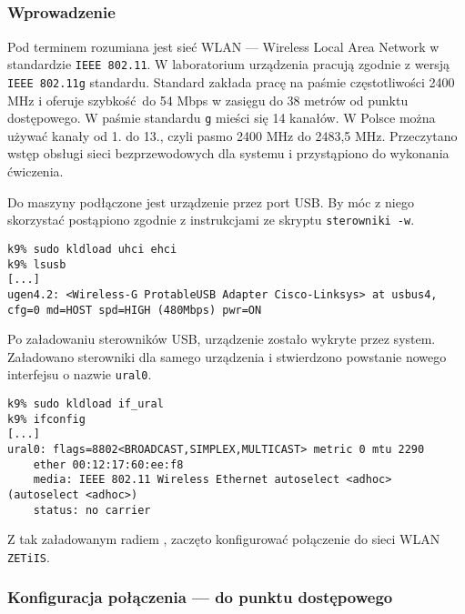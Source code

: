 \subsection{\wifi}

\subsubsection{Wprowadzenie}

Pod terminem \wifi{} rozumiana jest sieć WLAN --- Wireless Local Area Network w
standardzie \texttt{IEEE 802.11}. W laboratorium urządzenia pracują zgodnie z
wersją \texttt{IEEE 802.11g} standardu. Standard zakłada pracę na paśmie
częstotliwości 2400 MHz \cite{wifi:pasmo} i oferuje szybkość do 54 Mbps
\cite{wifi:szybkosc} w zasięgu do 38 metrów od punktu dostępowego. W paśmie
standardu \texttt{g} mieści się 14 kanałów. W Polsce można używać kanały od 1.
do 13., czyli pasmo 2400 MHz do 2483,5 MHz. Przeczytano wstęp obsługi sieci
bezprzewodowych \cite{wifi:bsd-handbook} dla systemu \bsd{} i przystąpiono do
wykonania ćwiczenia.

Do maszyny \kdziew{} podłączone jest urządzenie \wifi{} przez port USB. By móc z
niego skorzystać postąpiono zgodnie z instrukcjami ze skryptu \texttt{sterowniki
-w}.

\begin{lstlisting}
k9% sudo kldload uhci ehci
k9% lsusb
[...]
ugen4.2: <Wireless-G ProtableUSB Adapter Cisco-Linksys> at usbus4, cfg=0 md=HOST spd=HIGH (480Mbps) pwr=ON
\end{lstlisting}

Po załadowaniu sterowników USB, urządzenie \wifi{} zostało wykryte przez system.
Załadowano sterowniki dla samego urządzenia \wifi{} i stwierdzono powstanie
nowego interfejsu o nazwie \texttt{ural0}.

\begin{lstlisting}
k9% sudo kldload if_ural
k9% ifconfig
[...]
ural0: flags=8802<BROADCAST,SIMPLEX,MULTICAST> metric 0 mtu 2290
    ether 00:12:17:60:ee:f8
    media: IEEE 802.11 Wireless Ethernet autoselect <adhoc> (autoselect <adhoc>)
    status: no carrier
\end{lstlisting}

Z tak załadowanym radiem \wifi{}, zaczęto konfigurować połączenie do sieci WLAN
\texttt{ZETiIS}.

\subsubsection{Konfiguracja połączenia --- do punktu dostępowego}


